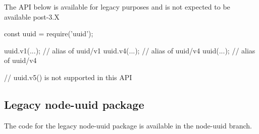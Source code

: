 The A\+PI below is available for legacy purposes and is not expected to be available post-\/3.\+X


\begin{DoxyCode}
const uuid = require('uuid');

uuid.v1(...); // alias of uuid/v1
uuid.v4(...); // alias of uuid/v4
uuid(...);    // alias of uuid/v4

// uuid.v5() is not supported in this API
\end{DoxyCode}


\subsection*{Legacy node-\/uuid package}

The code for the legacy node-\/uuid package is available in the {\ttfamily node-\/uuid} branch. 